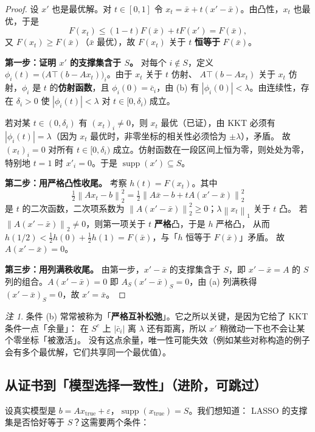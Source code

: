 \documentclass[11pt,a4paper,UTF8]{ctexart}
\theoremstyle{plain}
\theoremstyle{definition}
\theoremstyle{remark}
\newtheorem{remark}[theorem]{注}
\newcommand{\norm}[1]{\left\lVert #1 \right\rVert}
\newcommand{\abs}[1]{\left\lvert #1 \right\rvert}
\newcommand{\supp}{\operatorname{supp}}
\newcommand{\eps}{\varepsilon}
\begin{document}
\begin{proof}
设 $x'$ 也是最优解。对 $t\in[0,1]$ 令 $x_t=\bar x+t(x'-\bar x)$。由凸性，$x_t$ 也最优，于是
\[
F(x_t)\le(1-t)F(\bar x)+tF(x')=F(\bar x),
\]
又 $F(x_t)\ge F(\bar x)$（$\bar x$ 最优），故 $F(x_t)$ 关于 $t$ \textbf{恒等于} $F(\bar x)$。

\textbf{第一步：证明 $x'$ 的支撑集含于 $S$。}
对每个 $i\notin S$，定义 $\phi_i(t)=\bigl(A\top(b-Ax_t)\bigr)_i$。由于 $x_t$ 关于 $t$ 仿射、
$A\top(b-Ax_t)$ 关于 $x_t$ 仿射，$\phi_i$ 是 $t$ 的\textbf{仿射函数}，且
$\phi_i(0)=\bar c_i$，由 (b) 有 $\abs{\phi_i(0)}<\lambda$。由连续性，存在 $\delta_i>0$ 使
$\abs{\phi_i(t)}<\lambda$ 对 $t\in[0,\delta_i)$ 成立。

若对某 $t\in(0,\delta_i)$ 有 $(x_t)_i\neq0$，则 $x_t$ 最优（已证），由 KKT 必须有
$\abs{\phi_i(t)}=\lambda$（因为 $x_t$ 最优时，非零坐标的相关性必须恰为 $\pm\lambda$），矛盾。
故 $(x_t)_i=0$ 对所有 $t\in[0,\delta_i)$ 成立。仿射函数在一段区间上恒为零，则处处为零，
特别地 $t=1$ 时 $x'_i=0$。于是 $\supp(x')\subseteq S$。

\textbf{第二步：用严格凸性收尾。}
考察 $h(t)=F(x_t)$。其中
\[
\tfrac12\norm{Ax_t-b}_2^2
=\tfrac12\norm{A\bar x-b+tA(x'-\bar x)}_2^2
\]
是 $t$ 的二次函数，二次项系数为 $\norm{A(x'-\bar x)}_2^2\ge0$；$\lambda\norm{x_t}_1$ 关于 $t$ 凸。
若 $\norm{A(x'-\bar x)}_2\neq0$，则第一项关于 $t$ \textbf{严格}凸，于是 $h$ 严格凸，
从而 $h(1/2)<\tfrac12h(0)+\tfrac12h(1)=F(\bar x)$，与「$h$ 恒等于 $F(\bar x)$」矛盾。
故 $A(x'-\bar x)=0$。

\textbf{第三步：用列满秩收尾。}
由第一步，$x'-\bar x$ 的支撑集含于 $S$，即 $x'-\bar x=A$ 的 $S$ 列的组合。$A(x'-\bar x)=0$ 即
$A_S(x'-\bar x)_S=0$，由 (a) 列满秩得 $(x'-\bar x)_S=0$，故 $x'=\bar x$。
\end{proof}

\begin{remark}
条件 (b) 常常被称为「\textbf{严格互补松弛}」。它之所以关键，是因为它给了 KKT 条件一点「余量」：
在 $S^c$ 上 $\abs{\bar c_i}$ 离 $\lambda$ 还有距离，所以 $x'$ 稍微动一下也不会让某个零坐标「被激活」。
没有这点余量，唯一性可能失效（例如某些对称构造的例子会有多个最优解，它们共享同一个最优值）。
\end{remark}

\subsection{从证书到「模型选择一致性」（进阶，可跳过）}

设真实模型是 $b=Ax_{\mathrm{true}}+\eps$，$\supp(x_{\mathrm{true}})=S$。我们想知道：
LASSO 的支撑集是否恰好等于 $S$？这需要两个条件：
\end{document}
